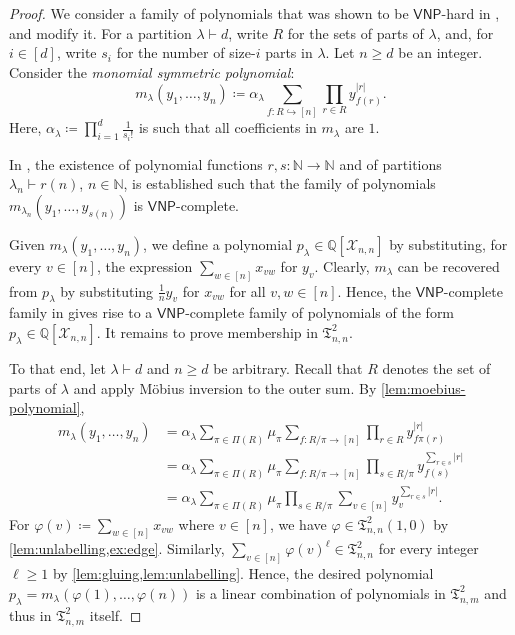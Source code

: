 \documentclass[11pt, DIV=15]{scrarticle}
\theoremstyle{definition}
\theoremstyle{plain}
\theoremstyle{remark}
\renewcommand{\phi}{\varphi}
\newcommand{\VNP}{\mathsf{VNP}}
\begin{document}
	\hardPolynomialsInT*
	
	
	
	\begin{proof}
		We consider a family of polynomials that was shown to be $\VNP$-hard in \cite[Theorem~1]{curticapean_et_al2022}, and modify it. 
		For a partition $\lambda \vdash d$, write $R$ for the sets of parts of $\lambda$,
		and, for $i \in [d]$, write $s_i$ for the number of size-$i$ parts in $\lambda$.
		Let $n \geq d$ be an integer. 
		Consider the \emph{monomial symmetric polynomial}:
		\[
		m_\lambda(y_1, \dots, y_n) \coloneqq \alpha_\lambda \sum_{f \colon R \hookrightarrow [n]} \prod_{r \in R} y_{f(r)}^{|r|}.
		\]	
		Here, $\alpha_\lambda \coloneqq \prod_{i=1}^d \frac{1}{s_i!}$ is such that all coefficients in $m_\lambda$ are $1$.
		
		In \cite[Theorem~1]{curticapean_et_al2022}, the existence of polynomial functions $r,s \colon \mathbb{N} \to \mathbb{N}$ and of partitions $\lambda_n \vdash r(n)$, $n \in \mathbb{N}$,
		is established such that the family of polynomials $m_{\lambda_n}(y_1, \dots, y_{s(n)})$ is $\VNP$-complete.
		
		Given $m_\lambda(y_1, \dots, y_n)$, we define a polynomial $p_\lambda \in \mathbb{Q}[\mathcal{X}_{n,n}]$ by substituting, for every $v \in [n]$, the expression $\sum_{w \in [n]} x_{vw}$ for $y_v$.
		Clearly, $m_\lambda$ can be recovered from $p_\lambda$ by substituting $\frac1n y_v$ for $x_{vw}$ for all $v, w \in [n]$.
		Hence, the $\VNP$-complete family in \cite[Theorem~1]{curticapean_et_al2022} gives rise to a $\VNP$-complete family of polynomials of the form $p_\lambda \in \mathbb{Q}[\mathcal{X}_{n,n}]$.
		It remains to prove membership in $\mathfrak{T}^2_{n,n}$.
		
		To that end, let $\lambda \vdash d$ and $n \geq d$ be arbitrary.
		Recall that $R$ denotes the set of parts of $\lambda$
		and apply Möbius inversion to the outer sum.
		By \cref{lem:moebius-polynomial},
		\begin{align*}
			m_\lambda(y_1, \dots, y_n) &= \alpha_\lambda \sum_{\pi \in \Pi(R)} \mu_\pi \sum_{f \colon R/\pi \to [n]} \prod_{r \in R} y_{f\pi(r)}^{|r|} \\
			&= \alpha_\lambda \sum_{\pi \in \Pi(R)} \mu_\pi \sum_{f \colon R/\pi \to [n]} \prod_{s \in R/\pi} y_{f(s)}^{\sum_{r \in s}|r|} \\
			&= \alpha_\lambda  \sum_{\pi \in \Pi(R)} \mu_\pi \prod_{s \in R/\pi} \sum_{v \in [n]} y_v^{\sum_{r \in s}|r|}.
		\end{align*}
		For $\phi(v) \coloneqq \sum_{w \in [n]} x_{vw}$ where $v \in [n]$,
		we have $\phi \in \mathfrak{T}^2_{n,n}(1,0)$ by \cref{lem:unlabelling,ex:edge}.
		Similarly, $\sum_{v \in [n]} \phi(v)^{\ell} \in \mathfrak{T}^2_{n,n}$ for every  integer $\ell \geq 1$ by  \cref{lem:gluing,lem:unlabelling}.
		Hence, the desired polynomial $p_{\lambda} = m_{\lambda}(\phi(1), \dots, \phi(n))$ is a linear combination of polynomials in $\mathfrak{T}^2_{n,m}$ and thus in $\mathfrak{T}^2_{n,m}$ itself.
	\end{proof}	
	
\end{document}
